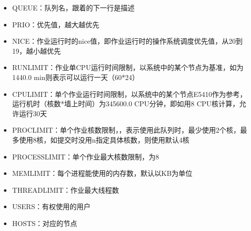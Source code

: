 \documentclass[a4paper,12pt,english]{sphinxmanual}
\begin{document}
\begin{sphinxVerbatim}[commandchars=\\\{\}]
                
                                
                                 

   

  
             
  \PYG{p}{[}\PYG{p}{]}
\end{sphinxVerbatim}
\begin{itemize}
\item {} 
\sphinxAtStartPar
QUEUE：队列名，跟着的下一行是描述

\item {} 
\sphinxAtStartPar
PRIO：优先值，越大越优先

\item {} 
\sphinxAtStartPar
NICE：作业运行时的nice值，即作业运行时的操作系统调度优先值，从\sphinxhyphen{}20到19，越小越优先

\item {} 
\sphinxAtStartPar
RUNLIMIT：作业单CPU运行时间限制，以系统中的某个节点为基准，如为1440.0 min则表示可以运行一天（60*24）

\item {} 
\sphinxAtStartPar
CPULIMIT：单个作业运行时间限制，以系统中的某个节点E5410作为参考，运行机时（核数*墙上时间）为345600.0 CPU分钟，即如用8 CPU核计算，允许运行30天

\item {} 
\sphinxAtStartPar
PROCLIMIT：单个作业核数限制，，表示使用此队列时，最少使用2个核，最多使用8核，如提交时没用\sphinxhyphen{}n指定具体核数，则使用默认4核

\item {} 
\sphinxAtStartPar
PROCESSLIMIT：单个作业最大核数限制，为8

\item {} 
\sphinxAtStartPar
MEMLIMIT：每个进程能使用的内存数，默认以KB为单位

\item {} 
\sphinxAtStartPar
THREADLIMIT：作业最大线程数

\item {} 
\sphinxAtStartPar
USERS：有权使用的用户

\item {} 
\sphinxAtStartPar
HOSTS：对应的节点

\end{itemize}
\end{document}
